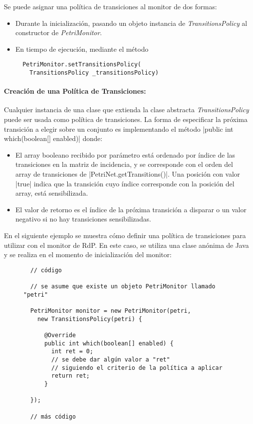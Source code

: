 Se puede asignar una política de transiciones al monitor de dos formas:

\begin{itemize}
    \item Durante la inicialización, pasando un objeto instancia de
    \textit{TransitionsPolicy} al constructor de \textit{PetriMonitor}.
    \item En tiempo de ejecución, mediante el método\\ {
    \begin{verbatim}
  PetriMonitor.setTransitionsPolicy(
    TransitionsPolicy _transitionsPolicy)
    \end{verbatim}
    }
\end{itemize}

\paragraph{Creación de una Política de Transiciones:}
Cualquier instancia de una clase que extienda la clase abstracta
\textit{TransitionsPolicy} puede ser usada como política de transiciones.
La forma de especificar la próxima transición a elegir sobre un conjunto es
implementando el método |public int which(boolean[] enabled)| donde:
\begin{itemize}
    \item El array booleano recibido por parámetro está ordenado por índice de
    las transiciones en la matriz de incidencia, y se corresponde con el orden
    del array de transiciones de |PetriNet.getTransitions()|. Una
    posición con valor |true| indica que la transición cuyo índice
    corresponde con la posición del array, está sensibilizada.
    \item El valor de retorno es el índice de la próxima transición a disparar
    o un valor negativo si no hay transiciones sensibilizadas.
\end{itemize}

En el siguiente ejemplo se muestra cómo definir una política de transiciones
para utilizar con el monitor de RdP. En este caso, se utiliza una clase anónima
de Java y se realiza en el momento de inicialización del monitor:

\begin{figure}[H]
\centering
\begin{verbatim}
  // código
  
  // se asume que existe un objeto PetriMonitor llamado "petri"
  
  PetriMonitor monitor = new PetriMonitor(petri,
    new TransitionsPolicy(petri) {

      @Override
      public int which(boolean[] enabled) {
        int ret = 0;
        // se debe dar algún valor a "ret"
        // siguiendo el criterio de la política a aplicar
        return ret;
      }

  });
  
  // más código
\end{verbatim}
\end{figure}

